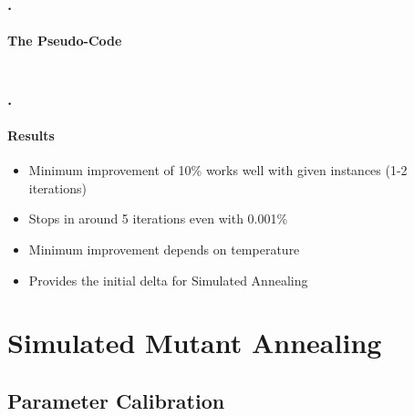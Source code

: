 \documentclass{beamer}
\begin{document}
	\begin{frame}
	   \frametitle{\thesection.\thesubsection \ \insertsubsection}
	   \framesubtitle{The Pseudo-Code}
	   	\begin{columns}[onlytextwidth]
\end{columns}
	\end{frame}

\begin{frame}
\frametitle{\thesection.\thesubsection \ \insertsubsection}
\framesubtitle{Results}

\begin{itemize}
	\item Minimum improvement of 10\% works well with given instances (1-2 iterations)
	\item Stops in around 5 iterations even with 0.001\%
	\item Minimum improvement depends on temperature %
	\item Provides the initial delta for Simulated Annealing
\end{itemize}

\end{frame}

\section{Simulated Mutant Annealing}

\subsection{Parameter Calibration}
\end{document}
